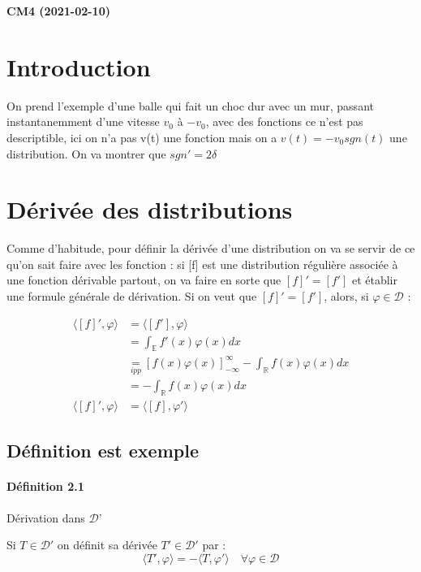 \documentclass[12pt,a4paper]{report}
\newcommand{\ens}[1]{\ensuremath{\mathbb{#1}}}
\newcommand{\fphi}{\quad \forall \varphi \in \mathcal{D}}
\newcommand{\D}{\ensuremath{\mathcal{D}}}
\begin{document}
\begin{center}
\textbf{CM4 (2021-02-10)}
\end{center}

\section{Introduction}

On prend l'exemple d'une balle qui fait un choc dur avec un mur, passant instantanemment d'une vitesse \(v_0\) à \(-v_0\), avec des fonctions ce n'est pas descriptible, ici on n'a pas v(t) une fonction mais on a \(v(t) = -v_0 sgn(t)\) une distribution.
On va montrer que \(sgn' = 2\delta\)

\section{Dérivée des distributions}

Comme d'habitude, pour définir la dérivée d'une distribution on va se servir de ce qu'on sait faire avec les fonction : si [f] est une distribution régulière associée à une fonction dérivable partout, on va faire en sorte que \([f]' = [f']\) et établir une formule générale de dérivation. Si on veut que \([f]' = [f']\), alors, si \(\varphi \in \D\) :

\begin{align*}
	\langle [f]', \varphi \rangle &= \langle [f'], \varphi \rangle\\
	&= \int_\ens{E} f'(x) \varphi(x) dx\\
	&\underset{ipp}{=} \left[f(x) \varphi(x)\right]_{-\infty}^{\infty} - \int_\ens{R} f(x) \varphi(x) dx\\
	&= -\int_\ens{R} f(x) \varphi(x) dx\\
	\langle [f]', \varphi \rangle &= \langle [f], \varphi' \rangle
\end{align*}

\subsection{Définition est exemple}

\paragraph{Définition 2.1} Dérivation dans \D'

Si \(T \in \D'\) on définit sa dérivée \(T' \in \D'\) par :
\[
	\langle T', \varphi \rangle = - \langle T, \varphi' \rangle \fphi
\]
\end{document}
